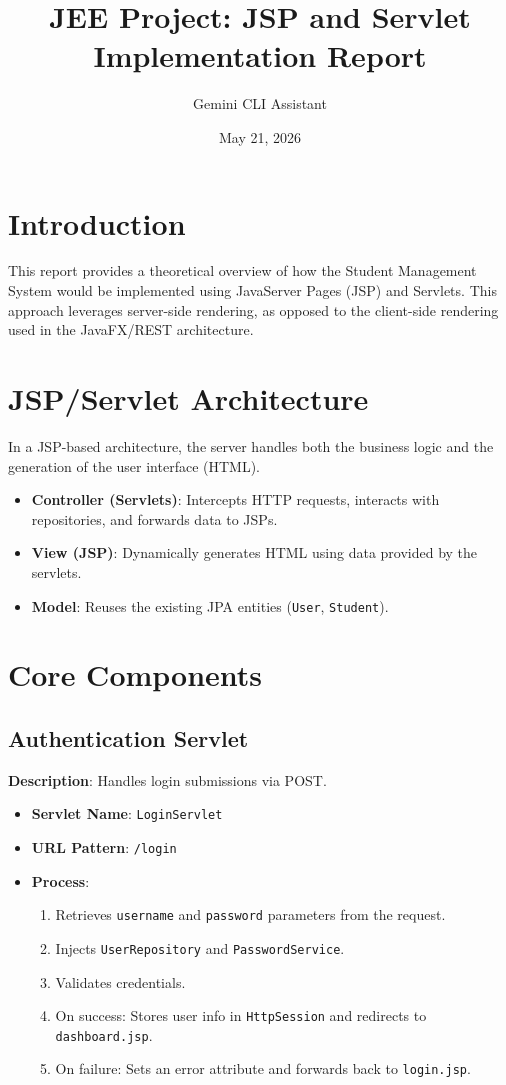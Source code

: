 \documentclass[12pt,a4paper]{article}
\title{JEE Project: JSP and Servlet Implementation Report}
\author{Gemini CLI Assistant}
\date{May 21, 2026}
\begin{document}
\maketitle

\section{Introduction}
This report provides a theoretical overview of how the Student Management System would be implemented using JavaServer Pages (JSP) and Servlets. This approach leverages server-side rendering, as opposed to the client-side rendering used in the JavaFX/REST architecture.

\section{JSP/Servlet Architecture}
In a JSP-based architecture, the server handles both the business logic and the generation of the user interface (HTML).
\begin{itemize}
    \item \textbf{Controller (Servlets)}: Intercepts HTTP requests, interacts with repositories, and forwards data to JSPs.
    \item \textbf{View (JSP)}: Dynamically generates HTML using data provided by the servlets.
    \item \textbf{Model}: Reuses the existing JPA entities (\texttt{User}, \texttt{Student}).
\end{itemize}

\section{Core Components}

\subsection{Authentication Servlet}
\textbf{Description}: Handles login submissions via POST.
\begin{itemize}
    \item \textbf{Servlet Name}: \texttt{LoginServlet}
    \item \textbf{URL Pattern}: \texttt{/login}
    \item \textbf{Process}:
    \begin{enumerate}
        \item Retrieves \texttt{username} and \texttt{password} parameters from the request.
        \item Injects \texttt{UserRepository} and \texttt{PasswordService}.
        \item Validates credentials.
        \item On success: Stores user info in \texttt{HttpSession} and redirects to \texttt{dashboard.jsp}.
        \item On failure: Sets an error attribute and forwards back to \texttt{login.jsp}.
    \end{enumerate}
\end{itemize}
\end{document}
